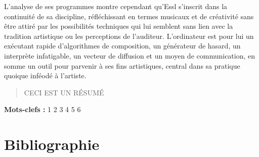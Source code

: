 \documentclass[a4paper,12pt]{article}
\begin{document}
L'analyse de ses programmes montre cependant qu'Essl s'inscrit dans la continuité de sa discipline, réfléchissant en termes musicaux et de créativité sans être attiré par les possibilités techniques qui lui semblent sans lien avec la tradition artistique ou les perceptions de l'auditeur. L'ordinateur est pour lui un exécutant rapide d'algorithmes de composition, un générateur de hasard, un interprète infatigable, un vecteur de diffusion et un moyen de communication, en somme un outil pour parvenir à ses fins artistiques, central dans sa pratique quoique inféodé à l'artiste.








\newpage
\begin{abstract}
CECI EST UN RÉSUMÉ
\end{abstract}
\bigskip
\textbf{Mots-clefs :} 1 2 3 4 5 6

\newpage
\nocite{*}
\section{Bibliographie}
\end{document}
